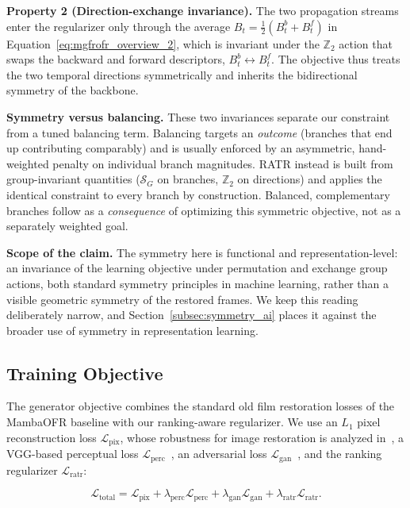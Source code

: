 \documentclass[symmetry,article,submit,pdftex,moreauthors]{Definitions/mdpi}
\begin{document}
\textbf{Property 2 (Direction-exchange invariance).} The two propagation streams enter the regularizer only through the average $B_t=\tfrac{1}{2}(B_t^{b}+B_t^{f})$ in Equation~\eqref{eq:mgfrofr_overview_2}, which is invariant under the $\mathbb{Z}_2$ action that swaps the backward and forward descriptors, $B_t^{b}\!\leftrightarrow\!B_t^{f}$. The objective thus treats the two temporal directions symmetrically and inherits the bidirectional symmetry of the backbone.

\textbf{Symmetry versus balancing.} These two invariances separate our constraint from a tuned balancing term. Balancing targets an \emph{outcome} (branches that end up contributing comparably) and is usually enforced by an asymmetric, hand-weighted penalty on individual branch magnitudes. RATR instead is built from group-invariant quantities ($\mathcal{S}_G$ on branches, $\mathbb{Z}_2$ on directions) and applies the identical constraint to every branch by construction. Balanced, complementary branches follow as a \emph{consequence} of optimizing this symmetric objective, not as a separately weighted goal.

\textbf{Scope of the claim.} The symmetry here is functional and representation-level: an invariance of the learning objective under permutation and exchange group actions, both standard symmetry principles in machine learning, rather than a visible geometric symmetry of the restored frames. We keep this reading deliberately narrow, and Section~\ref{subsec:symmetry_ai} places it against the broader use of symmetry in representation learning.

\subsection{Training Objective}
\label{subsec:training_objective}

The generator objective combines the standard old film restoration losses of the MambaOFR baseline with our ranking-aware regularizer. We use an $L_1$ pixel reconstruction loss $\mathcal{L}_{\mathrm{pix}}$, whose robustness for image restoration is analyzed in~\cite{zhao2017loss_restoration}, a VGG-based perceptual loss $\mathcal{L}_{\mathrm{perc}}$~\cite{johnson2016perceptual}, an adversarial loss $\mathcal{L}_{\mathrm{gan}}$~\cite{goodfellow2014gan}, and the ranking regularizer $\mathcal{L}_{\mathrm{ratr}}$:

\begin{equation}
\mathcal{L}_{\mathrm{total}} =
\mathcal{L}_{\mathrm{pix}}
+ \lambda_{\mathrm{perc}}\mathcal{L}_{\mathrm{perc}}
+ \lambda_{\mathrm{gan}}\mathcal{L}_{\mathrm{gan}}
+ \lambda_{\mathrm{ratr}}\mathcal{L}_{\mathrm{ratr}}.
\label{eq:loss_total}
\end{equation}
\end{document}
